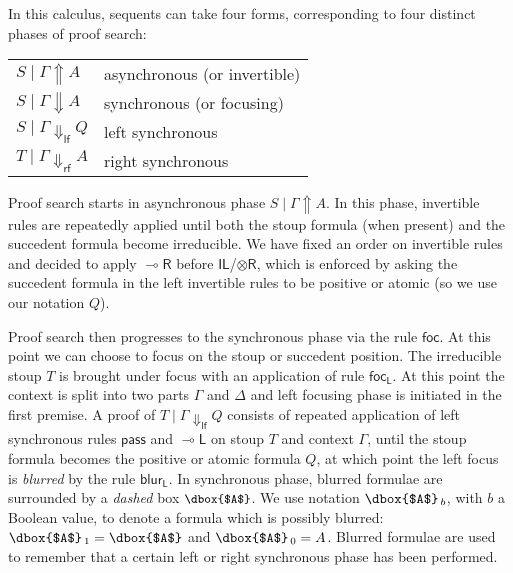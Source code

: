 \documentclass[runningheads]{llncs}
\newcommand{\tr}{\otimes \mathsf{R}}
\newcommand{\lright}{{\multimap}\mathsf{R}}
\newcommand{\lleft}{{\multimap}\mathsf{L}}
\newcommand{\pass}{\mathsf{pass}}
\newcommand{\unitl}{\mathsf{IL}}
\newcommand{\otR}{\tr}
\newcommand{\lolliR}{\lright}
\newcommand{\lolliL}{\lleft}
\newcommand{\IL}{\unitl}
\newcommand{\ax}{\mathsf{ax}}
\newcommand{\lf}{\dn_\mathsf{lf}}%
\newcommand{\rf}{\dn_\mathsf{rf}}%
\newcommand{\up}{\Uparrow}
\newcommand{\dn}{\Downarrow}
\newcommand{\focL}{\mathsf{foc_L}}
\newcommand{\foc}{\mathsf{foc}}
\newcommand{\blurL}{\mathsf{blur_L}}
\begin{document}
In this calculus, sequents can take four forms, corresponding to four distinct phases of proof search:
\begin{center}
  \begin{tabular}{|@{\;}l@{\qquad}l@{\;}|}
    \hline
    $S \mid \Gamma \up A$ & asynchronous (or invertible) \\
    $S \mid \Gamma \dn A$ & synchronous (or focusing) \\
    $S \mid \Gamma \lf Q$ & left synchronous \\
    $T \mid \Gamma \rf A$ & right synchronous \\
 \hline
\end{tabular}
    \end{center}

Proof search starts in asynchronous phase $S \mid \Gamma \up A$. In this phase, invertible rules are repeatedly applied until both the stoup formula (when present) and the succedent formula become irreducible. We have fixed an order on invertible rules and decided to apply $\lolliR$ before $\IL$/$\otR$, which is enforced by asking the succedent formula in the left invertible rules to be positive or atomic (so we use our notation $Q$). 

Proof search then progresses to the synchronous phase via the rule $\foc$. At this point we can %
choose to focus on the stoup or succedent position.
The irreducible stoup $T$ is brought under focus with an application of rule $\focL$. At this point the context is split into two parts $\Gamma$ and $\Delta$ and left focusing phase is initiated in the first premise. A proof of $T \mid \Gamma \lf Q$ consists of repeated application of left synchronous rules $\pass$ and $\lolliL$ on stoup $T$ and context $\Gamma$, until the stoup formula becomes the positive or atomic formula $Q$, at which point the left focus is \emph{blurred} by the rule $\blurL$. In synchronous phase, blurred formulae are surrounded by a \emph{dashed} box ${\small{\dbox{$A$}}}$. We use notation {\small{$\dbox{$A$}_{\,b}$}}, with $b$ a Boolean value, to denote a formula which is possibly blurred: {\small{$\dbox{$A$}_{\,1} = \dbox{$A$}$}} and {\small{$\dbox{$A$}_{\,0} = A$}}. Blurred formulae are used to remember that a certain left or right synchronous phase has been performed.
\end{document}
